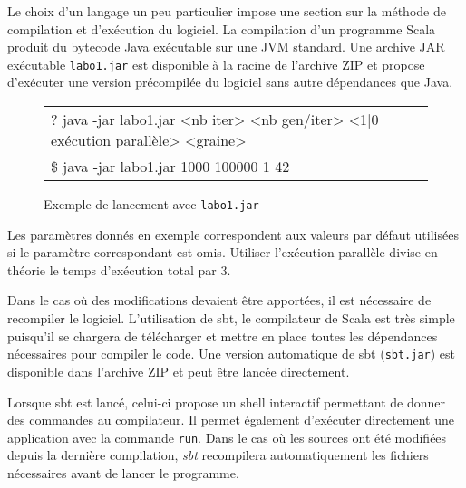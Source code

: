 \documentclass[a4paper,11pt]{article}
\begin{document}
Le choix d'un langage un peu particulier impose une section sur la méthode de compilation et d'exécution du logiciel. La compilation d'un programme Scala produit du bytecode Java exécutable sur une JVM standard. Une archive JAR exécutable \texttt{labo1.jar} est disponible à la racine de l'archive ZIP et propose d'exécuter une version précompilée du logiciel sans autre dépendances que Java.

\begin{figure}[h]
\begin{tabular}{l}
	\hline
	{\ttfamily\color{gray}
	? java -jar labo1.jar <nb iter> <nb gen/iter> <1|0 exécution parallèle> <graine>}\\
	{\ttfamily
	\$ java -jar labo1.jar 1000 100000 1 42}\\
	\hline
\end{tabular}
\caption{Exemple de lancement avec \texttt{labo1.jar}}
\end{figure}

Les paramètres donnés en exemple correspondent aux valeurs par défaut utilisées si le paramètre correspondant est omis. Utiliser l'exécution parallèle divise en théorie le temps d'exécution total par 3.

Dans le cas où des modifications devaient être apportées, il est nécessaire de recompiler le logiciel. L'utilisation de sbt, le compilateur de Scala est très simple puisqu'il se chargera de télécharger et mettre en place toutes les dépendances nécessaires pour compiler le code. Une version automatique de sbt (\texttt{sbt.jar}) est disponible dans l'archive ZIP et peut être lancée directement.

Lorsque sbt est lancé, celui-ci propose un shell interactif permettant de donner des commandes au compilateur. Il permet également d'exécuter directement une application avec la commande \texttt{run}. Dans le cas où les sources ont été modifiées depuis la dernière compilation, \emph{sbt} recompilera automatiquement les fichiers nécessaires avant de lancer le programme.
\end{document}
